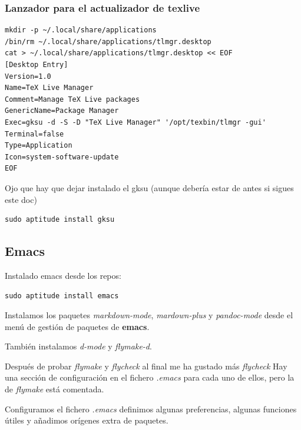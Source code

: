 \documentclass[12pt,spanish,]{scrartcl}
\begin{document}
\hypertarget{lanzador-para-el-actualizador-de-texlive}{%
\subsubsection{Lanzador para el actualizador de
texlive}\label{lanzador-para-el-actualizador-de-texlive}}

\begin{verbatim}
mkdir -p ~/.local/share/applications
/bin/rm ~/.local/share/applications/tlmgr.desktop
cat > ~/.local/share/applications/tlmgr.desktop << EOF
[Desktop Entry]
Version=1.0
Name=TeX Live Manager
Comment=Manage TeX Live packages
GenericName=Package Manager
Exec=gksu -d -S -D "TeX Live Manager" '/opt/texbin/tlmgr -gui'
Terminal=false
Type=Application
Icon=system-software-update
EOF
\end{verbatim}

Ojo que hay que dejar instalado el gksu (aunque debería estar de antes
si sigues este doc)

\begin{verbatim}
sudo aptitude install gksu
\end{verbatim}

\hypertarget{emacs}{%
\subsection{Emacs}\label{emacs}}

Instalado emacs desde los repos:

\begin{verbatim}
sudo aptitude install emacs
\end{verbatim}

Instalamos los paquetes \emph{markdown-mode}, \emph{mardown-plus} y
\emph{pandoc-mode} desde el menú de gestión de paquetes de
\textbf{emacs}.

También instalamos \emph{d-mode} y \emph{flymake-d}.

Después de probar \emph{flymake} y \emph{flycheck} al final me ha
gustado más \emph{flycheck} Hay una sección de configuración en el
fichero \emph{.emacs} para cada uno de ellos, pero la de \emph{flymake}
está comentada.

Configuramos el fichero \emph{.emacs} definimos algunas preferencias,
algunas funciones útiles y añadimos orígenes extra de paquetes.
\end{document}
